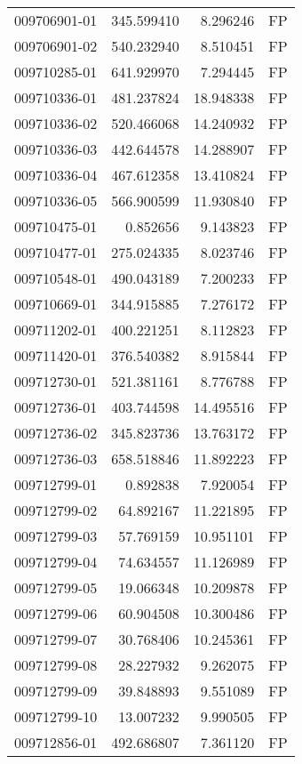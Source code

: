 \begin{tabular}{lrrl}
009706901-01 &  345.599410 &     8.296246 &   FP \\
009706901-02 &  540.232940 &     8.510451 &   FP \\
009710285-01 &  641.929970 &     7.294445 &   FP \\
009710336-01 &  481.237824 &    18.948338 &   FP \\
009710336-02 &  520.466068 &    14.240932 &   FP \\
009710336-03 &  442.644578 &    14.288907 &   FP \\
009710336-04 &  467.612358 &    13.410824 &   FP \\
009710336-05 &  566.900599 &    11.930840 &   FP \\
009710475-01 &    0.852656 &     9.143823 &   FP \\
009710477-01 &  275.024335 &     8.023746 &   FP \\
009710548-01 &  490.043189 &     7.200233 &   FP \\
009710669-01 &  344.915885 &     7.276172 &   FP \\
009711202-01 &  400.221251 &     8.112823 &   FP \\
009711420-01 &  376.540382 &     8.915844 &   FP \\
009712730-01 &  521.381161 &     8.776788 &   FP \\
009712736-01 &  403.744598 &    14.495516 &   FP \\
009712736-02 &  345.823736 &    13.763172 &   FP \\
009712736-03 &  658.518846 &    11.892223 &   FP \\
009712799-01 &    0.892838 &     7.920054 &   FP \\
009712799-02 &   64.892167 &    11.221895 &   FP \\
009712799-03 &   57.769159 &    10.951101 &   FP \\
009712799-04 &   74.634557 &    11.126989 &   FP \\
009712799-05 &   19.066348 &    10.209878 &   FP \\
009712799-06 &   60.904508 &    10.300486 &   FP \\
009712799-07 &   30.768406 &    10.245361 &   FP \\
009712799-08 &   28.227932 &     9.262075 &   FP \\
009712799-09 &   39.848893 &     9.551089 &   FP \\
009712799-10 &   13.007232 &     9.990505 &   FP \\
009712856-01 &  492.686807 &     7.361120 &   FP \\

\end{tabular}

